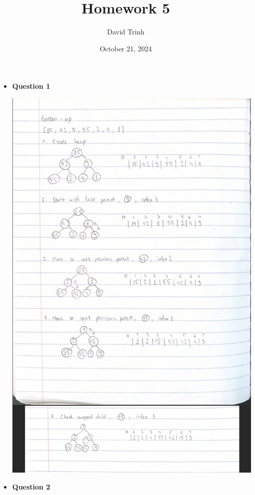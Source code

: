 \documentclass{article}
\title{Homework 5}
\author{David Trinh}
\date{October 21, 2024}
\begin{document}
\maketitle

\begin{itemize}

    \item\textbf{ Question 1}

        \includegraphics[scale=0.72]{HW5_Q1.png}

    \item\textbf{ Question 2}


\end{itemize}
\end{document}

